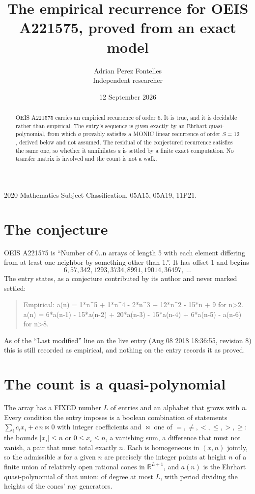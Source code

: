 \documentclass[11pt,a4paper]{article}
\title{The empirical recurrence for OEIS A221575, proved from an exact model}
\author{Adrian Perez Fontelles\\ \small Independent researcher}
\date{12 September 2026}
\theoremstyle{plain}
\theoremstyle{definition}
\begin{document}
\maketitle

\begin{abstract}
OEIS A221575 carries an empirical recurrence of order $6$. It is true, and it is
decidable rather than empirical. The entry's sequence is given exactly by an Ehrhart quasi-polynomial, from
which $a$ provably satisfies a MONIC linear recurrence of order $S=12$, derived below and not
assumed. The residual of the conjectured recurrence satisfies the same one, so whether it
annihilates $a$ is settled by a finite exact computation. No transfer matrix is involved and
the count is not a walk.
\end{abstract}

\noindent\small 2020 Mathematics Subject Classification. 05A15, 05A19, 11P21.\normalsize

\section{The conjecture}

OEIS A221575 is ``Number of 0..n arrays of length 5 with each element differing from at least one neighbor by something other than 1.''. It has offset $1$ and begins
\[
6, 57, 342, 1293, 3734, 8991, 19014, 36497,\ \dots
\]
The entry states, as a conjecture contributed by its author and never marked settled:
\begin{quote}
Empirical: a(n) = 1*n\^{}5 + 1*n\^{}4 - 2*n\^{}3 + 12*n\^{}2 - 15*n + 9 for n>2. a(n) = 6*a(n-1) - 15*a(n-2) + 20*a(n-3) - 15*a(n-4) + 6*a(n-5) - a(n-6) for n>8.
\end{quote}
As of the ``Last modified'' line on the live entry (Aug 08 2018 18:36:55, revision 8)
this is still recorded as empirical, and nothing on the entry records it as proved.

\section{The count is a quasi-polynomial}

The array has a FIXED number $L$ of entries and an alphabet that grows with $n$. Every
condition the entry imposes is a boolean combination of statements
$\sum_i c_ix_i + c\,n \bowtie 0$ with integer coefficients and $\bowtie$ one of
$=,\ne,<,\le,>,\ge$: the bounds $|x_i|\le n$ or $0\le x_i\le n$, a vanishing sum, a difference
that must not vanish, a pair that must total exactly $n$. Each is homogeneous in $(x,n)$
jointly, so the admissible $x$ for a given $n$ are precisely the integer points at height $n$
of a finite union of relatively open rational cones in $\mathbb{R}^{L+1}$, and $a(n)$ is
the Ehrhart quasi-polynomial of that union: of degree at most $L$, with period dividing the
heights of the cones' ray generators.
\end{document}
